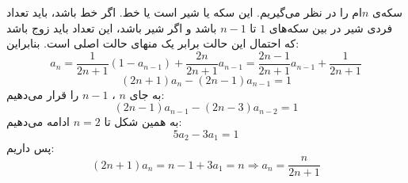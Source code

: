 \p
سکه‌ی $n$ام را در نظر می‌گیریم. این سکه یا شیر است یا خط. اگر خط باشد، باید تعداد فردی شیر در بین سکه‌های
$1$
تا
$n - 1$
باشد و اگر شیر باشد، این تعداد باید زوج باشد که احتمال این حالت برابر یک منهای حالت اصلی است. بنابراین:
$$a_n = \frac{1}{2n + 1}(1 - a_{n-1}) + \frac{2n}{2n + 1}a_{n-1} = \frac{2n - 1}{2n + 1}a_{n-1} + \frac{1}{2n + 1}$$
$$(2n + 1)a_n - (2n - 1)a_{n-1} = 1$$
به جای
$n$
،
$n - 1$
را قرار می‌دهیم:
$$(2n - 1)a_{n-1} - (2n - 3)a_{n-2} = 1$$
به همین شکل تا
$n = 2$
ادامه می‌دهیم:
$$5a_2 - 3a_1 = 1$$
پس داریم:
$$(2n + 1)a_n = n - 1 + 3a_1 = n \Rightarrow a_n = \frac{n}{2n + 1}$$
